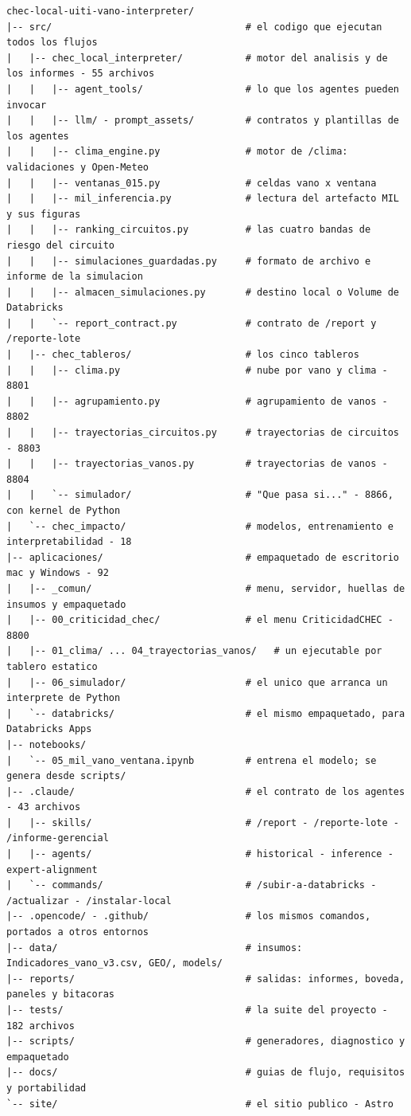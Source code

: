 \documentclass[11pt,a4paper]{article}
\begin{document}
\begin{Verbatim}[frame=single,framesep=3mm,fontsize=\scriptsize,baselinestretch=0.95]
chec-local-uiti-vano-interpreter/
|-- src/                                  # el codigo que ejecutan todos los flujos
|   |-- chec_local_interpreter/           # motor del analisis y de los informes - 55 archivos
|   |   |-- agent_tools/                  # lo que los agentes pueden invocar
|   |   |-- llm/ - prompt_assets/         # contratos y plantillas de los agentes
|   |   |-- clima_engine.py               # motor de /clima: validaciones y Open-Meteo
|   |   |-- ventanas_015.py               # celdas vano x ventana
|   |   |-- mil_inferencia.py             # lectura del artefacto MIL y sus figuras
|   |   |-- ranking_circuitos.py          # las cuatro bandas de riesgo del circuito
|   |   |-- simulaciones_guardadas.py     # formato de archivo e informe de la simulacion
|   |   |-- almacen_simulaciones.py       # destino local o Volume de Databricks
|   |   `-- report_contract.py            # contrato de /report y /reporte-lote
|   |-- chec_tableros/                    # los cinco tableros
|   |   |-- clima.py                      # nube por vano y clima - 8801
|   |   |-- agrupamiento.py               # agrupamiento de vanos - 8802
|   |   |-- trayectorias_circuitos.py     # trayectorias de circuitos - 8803
|   |   |-- trayectorias_vanos.py         # trayectorias de vanos - 8804
|   |   `-- simulador/                    # "Que pasa si..." - 8866, con kernel de Python
|   `-- chec_impacto/                     # modelos, entrenamiento e interpretabilidad - 18
|-- aplicaciones/                         # empaquetado de escritorio mac y Windows - 92
|   |-- _comun/                           # menu, servidor, huellas de insumos y empaquetado
|   |-- 00_criticidad_chec/               # el menu CriticidadCHEC - 8800
|   |-- 01_clima/ ... 04_trayectorias_vanos/   # un ejecutable por tablero estatico
|   |-- 06_simulador/                     # el unico que arranca un interprete de Python
|   `-- databricks/                       # el mismo empaquetado, para Databricks Apps
|-- notebooks/
|   `-- 05_mil_vano_ventana.ipynb         # entrena el modelo; se genera desde scripts/
|-- .claude/                              # el contrato de los agentes - 43 archivos
|   |-- skills/                           # /report - /reporte-lote - /informe-gerencial
|   |-- agents/                           # historical - inference - expert-alignment
|   `-- commands/                         # /subir-a-databricks - /actualizar - /instalar-local
|-- .opencode/ - .github/                 # los mismos comandos, portados a otros entornos
|-- data/                                 # insumos: Indicadores_vano_v3.csv, GEO/, models/
|-- reports/                              # salidas: informes, boveda, paneles y bitacoras
|-- tests/                                # la suite del proyecto - 182 archivos
|-- scripts/                              # generadores, diagnostico y empaquetado
|-- docs/                                 # guias de flujo, requisitos y portabilidad
`-- site/                                 # el sitio publico - Astro
\end{Verbatim}
\end{document}
